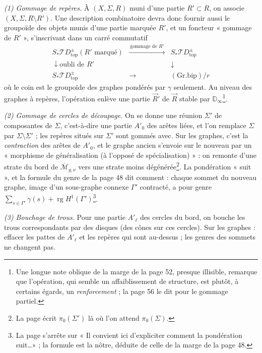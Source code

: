 \documentclass[11pt,a4paper]{article}
\begin{document}
\emph{(1) Gommage de repères.} À $(X, \Sigma, R)$ muni d'une partie $R' \subset
R$, on associe $(X, \Sigma, R \setminus R')$. Une description combinatoire devra
donc fournir aussi le groupoïde des objets munis d'une partie marquée $R'$, et
un foncteur « gommage de $R'$ », s'inscrivant dans un carré commutatif
\[
\begin{array}{ccc}
S_{*}\mathcal{T}D^{\pm}_{\mathrm{top}}(R' \text{ marqué}) &
\xrightarrow{\ \text{gommage de } R'\ } & S_{*}\mathcal{T}D^{\pm}_{\mathrm{top}} \\
\downarrow{\scriptstyle \text{oubli de } R'} & & \downarrow \\
S_{*}\mathcal{T}D^{\pm}_{\mathrm{top}} & \longrightarrow & (\mathrm{Gr.bip})/r
\end{array}
\]
où le coin est le groupoïde des graphes pondérés par $\gamma$ seulement. Au
niveau des graphes à repères, l'opération enlève une partie $\vec{R}'$ de
$\vec{R}$ stable par $\mathbb{D}_\infty$\footnote{Une longue note oblique de la
marge de la page 52, presque illisible, remarque que l'opération, qui semble un
affaiblissement de structure, est plutôt, à certains égards, un
\emph{renforcement} ; la page 56 le dit pour le gommage partiel.}.

\emph{(2) Gommage de cercles de découpage.} On se donne une réunion $\Sigma'$ de
composantes de $\Sigma$, c'est-à-dire une partie $A'_0$ des arêtes liées, et
l'on remplace $\Sigma$ par $\Sigma \setminus \Sigma'$ ; les repères situés sur
$\Sigma'$ sont gommés avec. Sur les graphes, c'est la \emph{contraction} des
arêtes de $A'_0$, et le graphe ancien s'envoie sur le nouveau par un
« morphisme de généralisation (à l'opposé de spécialisation) » : on remonte
d'une strate du bord de $\overline{\mathcal{M}}_{g,\nu}$ vers une strate moins
dégénérée\footnote{La page écrit $\pi_0(\Sigma')$ là où l'on attend
$\pi_0(\Sigma)$.}. La pondération « suit », et la formule du genre de la page
48 dit comment : chaque sommet du nouveau graphe, image d'un sous-graphe connexe
$\Gamma'$ contracté, a pour genre $\sum_{s \in \Gamma'} \gamma(s) +
\operatorname{rg} H^{1}(\Gamma')$\footnote{La page s'arrête sur « Il convient ici
d'expliciter comment la pondération suit\ldots » ; la formule est la nôtre,
déduite de celle de la marge de la page 48.}.

\emph{(3) Bouchage de trous.} Pour une partie $A'_\ell$ des cercles du bord, on
bouche les trous correspondants par des disques (des cônes sur ces cercles). Sur
les graphes : effacer les pattes de $A'_\ell$ et les repères qui sont au-dessus ;
les genres des sommets ne changent pas.
\end{document}
